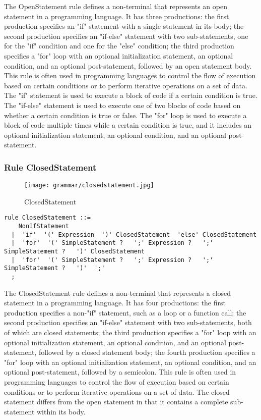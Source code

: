 The OpenStatement rule defines a non-terminal that represents an open statement in a programming language. It has three productions: the first production specifies an "if" statement with a single statement in its body; the second production specifies an "if-else" statement with two sub-statements, one for the "if" condition and one for the "else" condition; the third production specifies a "for" loop with an optional initialization statement, an optional condition, and an optional post-statement, followed by an open statement body. This rule is often used in programming languages to control the flow of execution based on certain conditions or to perform iterative operations on a set of data. The "if" statement is used to execute a block of code if a certain condition is true. The "if-else" statement is used to execute one of two blocks of code based on whether a certain condition is true or false. The "for" loop is used to execute a block of code multiple times while a certain condition is true, and it includes an optional initialization statement, an optional condition, and an optional post-statement.

\subsubsection*{Rule ClosedStatement}

\begin{figure}
\centering
\texttt{[image: grammar/closedstatement.jpg]}
\caption{ClosedStatement}
\end{figure}

\begin{lstlisting}
rule ClosedStatement ::=
    NonIfStatement 
  |  'if'  '(' Expression  ')' ClosedStatement  'else' ClosedStatement 
  |  'for'  '(' SimpleStatement ?   ';' Expression ?   ';' SimpleStatement ?   ')' ClosedStatement 
  |  'for'  '(' SimpleStatement ?   ';' Expression ?   ';' SimpleStatement ?   ')'  ';' 
  ;
\end{lstlisting}

The ClosedStatement rule defines a non-terminal that represents a closed statement in a programming language. It has four productions: the first production specifies a non-"if" statement, such as a loop or a function call; the second production specifies an "if-else" statement with two sub-statements, both of which are closed statements; the third production specifies a "for" loop with an optional initialization statement, an optional condition, and an optional post-statement, followed by a closed statement body; the fourth production specifies a "for" loop with an optional initialization statement, an optional condition, and an optional post-statement, followed by a semicolon. This rule is often used in programming languages to control the flow of execution based on certain conditions or to perform iterative operations on a set of data. The closed statement differs from the open statement in that it contains a complete sub-statement within its body.

